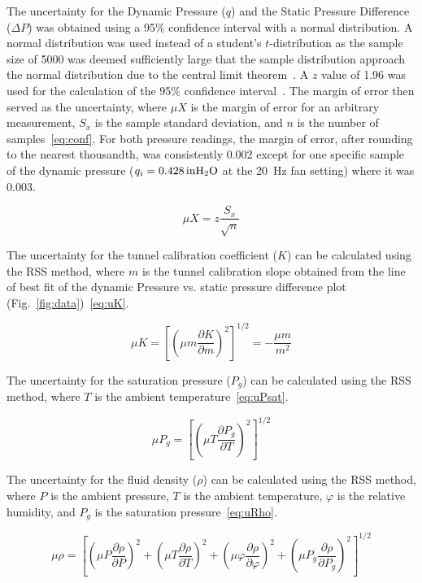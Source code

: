 \documentclass[journal,letterpaper]{IEEEtran}
\begin{document}
The uncertainty for the Dynamic Pressure ($q$) and the Static Pressure Difference ($\Delta P$) was obtained using a 95\% confidence interval with a normal distribution.
A normal distribution was used instead of a student's $t$-distribution as the sample size of 5000 was deemed sufficiently large that the sample distribution approach the normal distribution due to the central limit theorem~\cite{MoMLecture}.
A $z$ value of 1.96 was used for the calculation of the 95\% confidence interval~\cite{MoMLecture}.
The margin of error then served as the uncertainty, where $\mu X$ is the margin of error for an arbitrary measurement, $S_x$ is the sample standard deviation, and $n$ is the number of samples~\eqref{eq:conf}.
For both pressure readings, the margin of error, after rounding to the nearest thousandth, was consistently 0.002 except for one specific sample of the dynamic pressure ($q_i = \qty{0.428}{in\ce{H_2O}}$ at the \qty{20}{\Hz} fan setting) where it was 0.003.

\begin{equation} \label{eq:conf}
    \mu X = z \frac{S_x}{\sqrt{n}}
\end{equation}

The uncertainty for the tunnel calibration coefficient ($K$) can be calculated using the RSS method, where $m$ is the tunnel calibration slope obtained from the line of best fit of the dynamic Pressure vs. static pressure difference plot (Fig.~\ref{fig:data})~\eqref{eq:uK}.

\begin{equation} \label{eq:uK}
    \mu K = \left[\left(\mu m \frac{\partial K}{\partial m}\right)^2\right]^{1/2} = -\frac{\mu m}{m^2}
\end{equation}

The uncertainty for the saturation pressure ($P_g$) can be calculated using the RSS method, where $T$ is the ambient temperature~\eqref{eq:uPsat}.

\begin{equation} \label{eq:uPsat}
    \mu P_g = \left[\left(\mu T \frac{\partial P_g}{\partial T}\right)^2\right]^{1/2}
\end{equation}

The uncertainty for the fluid density ($\rho$) can be calculated using the RSS method, where $P$ is the ambient pressure, $T$ is the ambient temperature, $\varphi$ is the relative humidity, and $P_g$ is the saturation pressure~\eqref{eq:uRho}.

\begin{equation} \label{eq:uRho}
    \mu \rho = \left[\left(\mu P \frac{\partial \rho}{\partial P}\right)^2 + \left(\mu T \frac{\partial \rho}{\partial T}\right)^2 + \left(\mu \varphi \frac{\partial \rho}{\partial \varphi}\right)^2 + \left(\mu P_g \frac{\partial \rho}{\partial P_g}\right)^2\right]^{1/2}
\end{equation}
\end{document}
